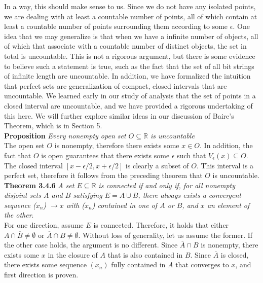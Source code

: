 \documentclass[12pt, letterpaper, twoside]{article}
\begin{document}
In a way, this should make sense to us. Since we do not have any isolated points, we are dealing with at least a countable number of points, all of which contain at least a countable number of points surrounding them according to some $\epsilon$. One idea that we may generalize is that when we have a infinite number of objects, all of which that associate with a countable number of distinct objects, the set in total is uncountable. This is not a rigorous argument, but there is some evidence to believe such a statement is true, such as the fact that the set of all bit strings of infinite length are uncountable. In addition, we have formalized the intuition that perfect sets are generalization of compact, closed intervals that are uncountable. We learned early in our study of analysis that the set of points in a closed interval are uncountable, and we have provided a rigorous undertaking of this here. We will further explore similar ideas in our discussion of Baire's Theorem, which is in Section 5. \\

\textbf{Proposition} \textit{Every nonempty open set $O \subseteq \mathbb{R}$ is uncountable} \\

The open set $O$ is nonempty, therefore there exists some $x \in O$. In addition, the fact that $O$ is open guarantees that there exists some $\epsilon$ such that $V_\epsilon (x) \subseteq O$. The closed interval $[x - \epsilon/2, x + \epsilon/2]$ is clearly a subset of $O$. This interval is a perfect set, therefore it follows from the preceding theorem that $O$ is uncountable. \\

\textbf{Theorem 3.4.6} \textit{A set $E \subseteq \mathbb{R}$ is connected if and only if, for all nonempty
disjoint sets $A$ and $B$ satisfying $E = A \cup B$, there always exists a convergent
sequence ($x_n$) $\to x$ with ($x_n$) contained in one of $A$ or $B$, and $x$ an element of
the other}. \\

For one direction, assume $E$ is connected. Therefore, it holds that either $A \cap \overline{B} \neq \emptyset$ or $\overline{A} \cap B \neq \emptyset$. Without loss of generality, let us assume the former. If the other case holds, the argument is no different. Since $\overline{A} \cap B$ is nonempty, there exists some $x$ in the closure of $A$ that is also contained in $B$. Since $\overline{A}$ is closed, there exists some sequence $(x_n)$ fully contained in $A$ that converges to $x$, and first direction is proven. \\
\end{document}

